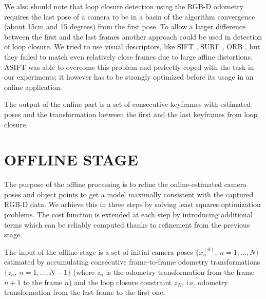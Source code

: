 \documentclass[letterpaper, 10 pt, conference]{ieeeconf}  %
\begin{document}
We also should note that loop closure detection using the RGB-D odometry requires
the last pose of a camera to be in a basin of
the algorithm convergence (about 15cm and 15 degrees) from the first pose. 
To allow a larger difference between the first and the last frames
another approach could be used in detection of loop closure. We tried to use visual descriptors, like
SIFT \cite{lowe2004distinctive}, SURF \cite{bay2006surf}, ORB \cite{rublee2011orb}, but they failed to match even
relatively close frames due to large affine distortions.
ASIFT \cite{morel2009asift} was able to overcome this problem
and perfectly coped with the task in our experiments;
it however has to be strongly optimized before its usage in an online application.

The output of the online part is a set of consecutive keyframes with 
estimated poses and the transformation between the first and the last 
keyframes from loop closure.


\section{OFFLINE STAGE}

\label{sec:offline}

The purpose of the offline processing is to refine the online-estimated 
camera poses and object points to get a model maximally 
consistent with the captured RGB-D data. We achieve this in three steps by 
solving least squares optimization problems. The cost function is extended at each step 
by introducing additional terms which can be reliably computed
thanks to refinement from the previous stage.


The input of the offline stage is a set of initial camera poses $\{x_n^{(0)},~n=1,\dots, N\}$ 
estimated by accumulating consecutive frame-to-frame odometry transformations 
$\{z_n,~n=1,\dots, N-1\}$  
(where $z_n$ is the odometry transformation from the frame $n+1$ to the frame $n$)
and the loop closure constraint $z_{N}$, 
i.e. odometry transformation from the last frame to the first one.
\end{document}
